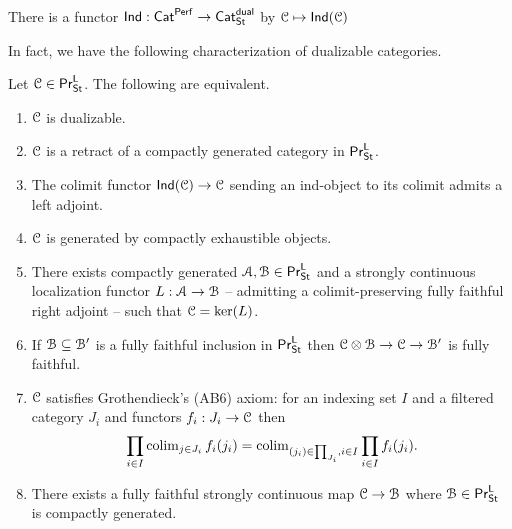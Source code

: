 \begin{example}
    There is a functor $\mathsf{Ind}:\mathsf{Cat}^{\mathsf{Perf}}\to\mathsf{Cat}^{\mathsf{dual}}_{\mathsf{St}}$ by $\EuScript{C}\mapsto\mathsf{Ind}(\EuScript{C})$
\end{example}
In fact, we have the following characterization of dualizable categories. 
\begin{theorem}\label{thm: characterization of dualizable categories}
    Let $\EuScript{C}\in\mathsf{Pr}^{\mathsf{L}}_{\mathsf{St}}$. The following are equivalent. 
    \begin{enumerate}
        \item $\EuScript{C}$ is dualizable. 
        \item $\EuScript{C}$ is a retract of a compactly generated category in $\mathsf{Pr}^{\mathsf{L}}_{\mathsf{St}}$. 
        \item The colimit functor $\mathsf{Ind}(\EuScript{C})\to\EuScript{C}$ sending an ind-object to its colimit admits a left adjoint. 
        \item $\EuScript{C}$ is generated by compactly exhaustible objects. 
        \item There exists compactly generated $\EuScript{A},\EuScript{B}\in\mathsf{Pr}^{\mathsf{L}}_{\mathsf{St}}$ and a strongly continuous localization functor $L:\EuScript{A}\to\EuScript{B}$ -- admitting a colimit-preserving fully faithful right adjoint -- such that $\EuScript{C}=\ker(L)$. 
        \item If $\EuScript{B}\subseteq\EuScript{B}'$ is a fully faithful inclusion in $\mathsf{Pr}^{\mathsf{L}}_{\mathsf{St}}$ then $\EuScript{C}\otimes\EuScript{B}\to\EuScript{C}\to\EuScript{B}'$ is fully faithful.
        \item $\EuScript{C}$ satisfies Grothendieck's (AB6) axiom: for an indexing set $I$ and a filtered category $J_{i}$ and functors $f_{i}:J_{i}\to\EuScript{C}$ then 
        $$\prod_{i\in I}\operatorname{colim}_{j\in J_{i}}f_{i}(j_{i})=\operatorname{colim}_{(j_{i})\in\prod_{J_{i}},i\in I}\prod_{i\in I}f_{i}(j_{i}).$$
        \item There exists a fully faithful strongly continuous map $\EuScript{C}\to\EuScript{B}$ where $\EuScript{B}\in\mathsf{Pr}^{\mathsf{L}}_{\mathsf{St}}$ is compactly generated. 
    \end{enumerate}
\end{theorem}

